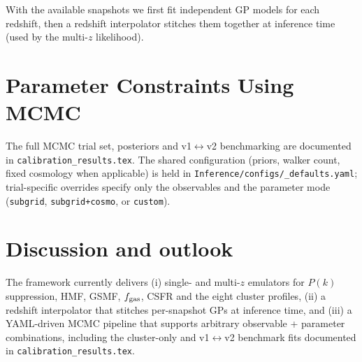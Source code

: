 \documentclass{article}
\begin{document}
With the available snapshots we first fit independent GP models for each redshift, then a redshift interpolator stitches them together at inference time (used by the multi-$z$ likelihood).


\section{Parameter Constraints Using MCMC}\label{sec:mcmc}

The full MCMC trial set, posteriors and v1$\leftrightarrow$v2 benchmarking are documented in \texttt{calibration\_results.tex}. The shared configuration (priors, walker count, fixed cosmology when applicable) is held in \texttt{Inference/configs/\_defaults.yaml}; trial-specific overrides specify only the observables and the parameter mode (\texttt{subgrid}, \texttt{subgrid+cosmo}, or \texttt{custom}).

\section{Discussion and outlook}
\label{sec:conclusions}

The framework currently delivers (i) single- and multi-$z$ emulators for $P(k)$ suppression, HMF, GSMF, $f_{\rm gas}$, CSFR and the eight cluster profiles, (ii) a redshift interpolator that stitches per-snapshot GPs at inference time, and (iii) a YAML-driven MCMC pipeline that supports arbitrary observable + parameter combinations, including the cluster-only and v1$\leftrightarrow$v2 benchmark fits documented in \texttt{calibration\_results.tex}.
\end{document}
